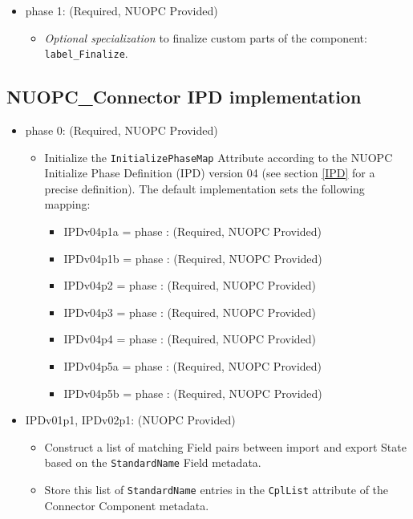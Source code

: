 \begin{itemize}
\item phase 1: ({\sc Required, NUOPC Provided})
  \begin{itemize}
  \item {\it Optional specialization} to finalize custom parts of the component: {\tt label\_Finalize}.
  \end{itemize}      
\end{itemize}

\subsection{NUOPC\_Connector IPD implementation}
\begin{itemize}
\item phase 0: ({\sc Required, NUOPC Provided})
  \begin{itemize}
  \item Initialize the {\tt InitializePhaseMap} Attribute according to the NUOPC Initialize Phase Definition (IPD) version 04 (see section \ref{IPD} for a precise definition). The default implementation sets the following mapping:
    \begin{itemize}
    \item IPDv04p1a = phase : ({\sc Required, NUOPC Provided})
    \item IPDv04p1b = phase : ({\sc Required, NUOPC Provided})
    \item IPDv04p2  = phase : ({\sc Required, NUOPC Provided})
    \item IPDv04p3  = phase : ({\sc Required, NUOPC Provided})
    \item IPDv04p4  = phase : ({\sc Required, NUOPC Provided})
    \item IPDv04p5a = phase : ({\sc Required, NUOPC Provided})
    \item IPDv04p5b = phase : ({\sc Required, NUOPC Provided})
    \end{itemize}  
  \end{itemize}  
\item IPDv01p1, IPDv02p1: ({\sc NUOPC Provided})
  \begin{itemize}
  \item Construct a list of matching Field pairs between import and export State based on the {\tt StandardName} Field metadata. 
  \item Store this list of {\tt StandardName} entries in the {\tt CplList} attribute of the Connector Component metadata.

\end{itemize}
\end{itemize}
